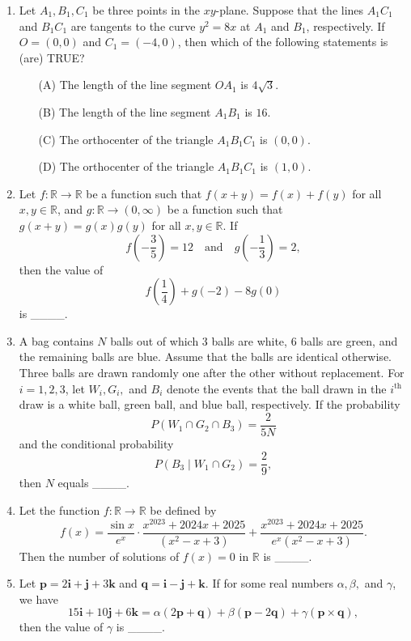\documentclass[12pt,a4paper]{article}
\begin{document}
\begin{enumerate}
    \item Let $ A_1, B_1, C_1 $ be three points in the $ xy $-plane. Suppose that the lines $ A_1C_1 $ and $ B_1C_1 $ are tangents to the curve $ y^2 = 8x $ at $ A_1 $ and $ B_1 $, respectively.  
    If $ O = (0, 0) $ and $ C_1 = (-4, 0) $, then which of the following statements is (are) TRUE?
    \begin{itemize}
        \item[(A)] The length of the line segment $ OA_1 $ is $ 4\sqrt{3} $.
        \item[(B)] The length of the line segment $ A_1B_1 $ is $ 16 $.
        \item[(C)] The orthocenter of the triangle $ A_1B_1C_1 $ is $ (0, 0) $.
        \item[(D)] The orthocenter of the triangle $ A_1B_1C_1 $ is $ (1, 0) $.
    \end{itemize}
     \item Let $ f : \mathbb{R} \to \mathbb{R} $ be a function such that $ f(x+y) = f(x) + f(y) $ for all $ x, y \in \mathbb{R} $, and $ g : \mathbb{R} \to (0, \infty) $ be a function such that $ g(x+y) = g(x)g(y) $ for all $ x, y \in \mathbb{R} $. If  
\[
    f\left( -\frac{3}{5} \right) = 12 \quad \text{and} \quad g\left( -\frac{1}{3} \right) = 2,
\]
    then the value of  
\[
    f\left( \frac{1}{4} \right) + g(-2) - 8g(0)
\]
    is \_\_\_\_.

    \item A bag contains $N$ balls out of which 3 balls are white, 6 balls are green, and the remaining balls are blue. Assume that the balls are identical otherwise. Three balls are drawn randomly one after the other without replacement. For $ i = 1,2,3 $, let $ W_i, G_i, $ and $ B_i $ denote the events that the ball drawn in the $ i^{\text{th}} $ draw is a white ball, green ball, and blue ball, respectively. If the probability  
\[
    P(W_1 \cap G_2 \cap B_3) = \frac{2}{5N}
\]
    and the conditional probability  
\[
    P(B_3 \mid W_1 \cap G_2) = \frac{2}{9},
\]
    then $ N $ equals \_\_\_\_.

    \item Let the function $ f: \mathbb{R} \to \mathbb{R} $ be defined by  
\[
    f(x) = \frac{\sin x}{e^x} \cdot \frac{x^{2023} + 2024x + 2025}{(x^2 - x + 3)}
    + \frac{x^{2023} + 2024x + 2025}{e^x (x^2 - x + 3)}.
\]
    Then the number of solutions of $ f(x) = 0 $ in $ \mathbb{R} $ is \_\_\_\_.

    \item Let $ \mathbf{p} = 2\mathbf{i} + \mathbf{j} + 3\mathbf{k} $ and $ \mathbf{q} = \mathbf{i} - \mathbf{j} + \mathbf{k} $. If for some real numbers $ \alpha, \beta, $ and $ \gamma $, we have  
\[
    15\mathbf{i} + 10\mathbf{j} + 6\mathbf{k} = \alpha (2\mathbf{p} + \mathbf{q}) + \beta (\mathbf{p} - 2\mathbf{q}) + \gamma (\mathbf{p} \times \mathbf{q}),
\]
    then the value of $ \gamma $ is \_\_\_\_.


\end{enumerate}
\end{document}
